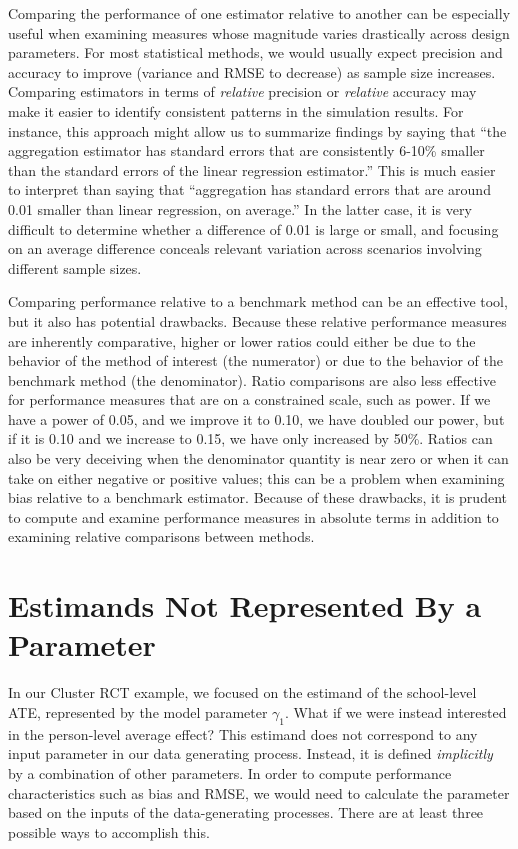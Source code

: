 \documentclass[
]{book}
\begin{document}
Comparing the performance of one estimator relative to another can be especially useful when examining measures whose magnitude varies drastically across design parameters.
For most statistical methods, we would usually expect precision and accuracy to improve (variance and RMSE to decrease) as sample size increases.
Comparing estimators in terms of \emph{relative} precision or \emph{relative} accuracy may make it easier to identify consistent patterns in the simulation results.
For instance, this approach might allow us to summarize findings by saying that ``the aggregation estimator has standard errors that are consistently 6-10\% smaller than the standard errors of the linear regression estimator.''
This is much easier to interpret than saying that ``aggregation has standard errors that are around 0.01 smaller than linear regression, on average.''
In the latter case, it is very difficult to determine whether a difference of 0.01 is large or small, and focusing on an average difference conceals relevant variation across scenarios involving different sample sizes.

Comparing performance relative to a benchmark method can be an effective tool, but it also has potential drawbacks.
Because these relative performance measures are inherently comparative, higher or lower ratios could either be due to the behavior of the method of interest (the numerator) or due to the behavior of the benchmark method (the denominator).
Ratio comparisons are also less effective for performance measures that are on a constrained scale, such as power.
If we have a power of 0.05, and we improve it to 0.10, we have doubled our power, but if it is 0.10 and we increase to 0.15, we have only increased by 50\%.
Ratios can also be very deceiving when the denominator quantity is near zero or when it can take on either negative or positive values; this can be a problem when examining bias relative to a benchmark estimator.
Because of these drawbacks, it is prudent to compute and examine performance measures in absolute terms in addition to examining relative comparisons between methods.

\section{Estimands Not Represented By a Parameter}\label{implicit-estimands}

In our Cluster RCT example, we focused on the estimand of the school-level ATE, represented by the model parameter \(\gamma_1\).
What if we were instead interested in the person-level average effect?
This estimand does not correspond to any input parameter in our data generating process.
Instead, it is defined \emph{implicitly} by a combination of other parameters.
In order to compute performance characteristics such as bias and RMSE, we would need to calculate the parameter based on the inputs of the data-generating processes.
There are at least three possible ways to accomplish this.
\end{document}
